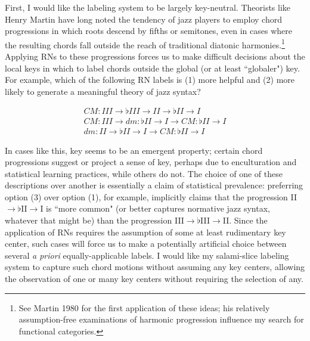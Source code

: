 First, I would like the labeling system to be largely key-neutral.  Theorists like Henry Martin have long noted the tendency of jazz players to employ chord progressions in which roots descend by fifths or semitones, even in cases where the resulting chords fall outside the reach of traditional diatonic harmonies.\footnote{See Martin 1980 for the first application of these ideas; his relatively assumption-free examinations of harmonic progression influence my search for functional categories.}  Applying RNs to these progressions forces us to make difficult decisions about the local keys in which to label chords outside the global (or at least ``globaler") key.  For example, which of the following RN labels is (1) more helpful and (2) more likely to generate a meaningful theory of jazz syntax?

\begin{align*}
CM: III \rightarrow \flat III \rightarrow II \rightarrow \flat II \rightarrow I \\
CM: III \rightarrow dm: \flat II \rightarrow I \rightarrow CM: \flat II \rightarrow I \\
dm: II \rightarrow \flat II \rightarrow I \rightarrow CM: \flat II \rightarrow I
\end{align*}

In cases like this, key seems to be an emergent property; certain chord progressions suggest or project a sense of key, perhaps due to enculturation and statistical learning practices, while others do not.  The choice of one of these descriptions over another is essentially a claim of statistical prevalence: preferring option (3) over option (1), for example, implicitly claims that the progression II$\rightarrow \flat$II$\rightarrow$I is ``more common" (or better captures normative jazz syntax, whatever that might be) than the progression III$\rightarrow \flat$III$\rightarrow$II.  Since the application of RNs requires the assumption of some at least rudimentary key center, such cases will force us to make a potentially artificial choice between several \emph{a priori} equally-applicable labels.  I would like my salami-slice labeling system to capture such chord motions without assuming any key centers, allowing the observation of one or many key centers without requiring the selection of any.

